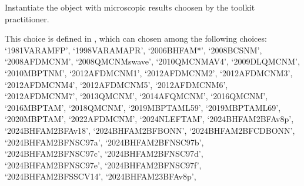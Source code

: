 \documentclass[letterpaper,10pt,english]{sphinxmanual}
\begin{document}
\begin{fulllineitems}
\label{\detokenize{source/api/setup_micro_matter:nucleardatapy.setup_micro_matter.SetupMicroMatter}}
\pysigstartsignatures
{}
\pysigstopsignatures
\sphinxAtStartPar
Instantiate the object with microscopic results choosen     by the toolkit practitioner.

\sphinxAtStartPar
This choice is defined in , which can chosen among     the following choices:     ‘1981\sphinxhyphen{}VAR\sphinxhyphen{}AM\sphinxhyphen{}FP’, ‘1998\sphinxhyphen{}VAR\sphinxhyphen{}AM\sphinxhyphen{}APR’, ‘2006\sphinxhyphen{}BHF\sphinxhyphen{}AM*’, ‘2008\sphinxhyphen{}BCS\sphinxhyphen{}NM’, ‘2008\sphinxhyphen{}AFDMC\sphinxhyphen{}NM’,     ‘2008\sphinxhyphen{}QMC\sphinxhyphen{}NM\sphinxhyphen{}swave’, ‘2010\sphinxhyphen{}QMC\sphinxhyphen{}NM\sphinxhyphen{}AV4’, ‘2009\sphinxhyphen{}DLQMC\sphinxhyphen{}NM’, ‘2010\sphinxhyphen{}MBPT\sphinxhyphen{}NM’,     ‘2012\sphinxhyphen{}AFDMC\sphinxhyphen{}NM\sphinxhyphen{}1’, ‘2012\sphinxhyphen{}AFDMC\sphinxhyphen{}NM\sphinxhyphen{}2’, ‘2012\sphinxhyphen{}AFDMC\sphinxhyphen{}NM\sphinxhyphen{}3’, ‘2012\sphinxhyphen{}AFDMC\sphinxhyphen{}NM\sphinxhyphen{}4’,     ‘2012\sphinxhyphen{}AFDMC\sphinxhyphen{}NM\sphinxhyphen{}5’, ‘2012\sphinxhyphen{}AFDMC\sphinxhyphen{}NM\sphinxhyphen{}6’, ‘2012\sphinxhyphen{}AFDMC\sphinxhyphen{}NM\sphinxhyphen{}7’,     ‘2013\sphinxhyphen{}QMC\sphinxhyphen{}NM’, ‘2014\sphinxhyphen{}AFQMC\sphinxhyphen{}NM’, ‘2016\sphinxhyphen{}QMC\sphinxhyphen{}NM’, ‘2016\sphinxhyphen{}MBPT\sphinxhyphen{}AM’,     ‘2018\sphinxhyphen{}QMC\sphinxhyphen{}NM’, ‘2019\sphinxhyphen{}MBPT\sphinxhyphen{}AM\sphinxhyphen{}L59’, ‘2019\sphinxhyphen{}MBPT\sphinxhyphen{}AM\sphinxhyphen{}L69’,     ‘2020\sphinxhyphen{}MBPT\sphinxhyphen{}AM’, ‘2022\sphinxhyphen{}AFDMC\sphinxhyphen{}NM’, ‘2024\sphinxhyphen{}NLEFT\sphinxhyphen{}AM’,     ‘2024\sphinxhyphen{}BHF\sphinxhyphen{}AM\sphinxhyphen{}2BF\sphinxhyphen{}Av8p’, ‘2024\sphinxhyphen{}BHF\sphinxhyphen{}AM\sphinxhyphen{}2BF\sphinxhyphen{}Av18’, ‘2024\sphinxhyphen{}BHF\sphinxhyphen{}AM\sphinxhyphen{}2BF\sphinxhyphen{}BONN’, ‘2024\sphinxhyphen{}BHF\sphinxhyphen{}AM\sphinxhyphen{}2BF\sphinxhyphen{}CDBONN’,     ‘2024\sphinxhyphen{}BHF\sphinxhyphen{}AM\sphinxhyphen{}2BF\sphinxhyphen{}NSC97a’, ‘2024\sphinxhyphen{}BHF\sphinxhyphen{}AM\sphinxhyphen{}2BF\sphinxhyphen{}NSC97b’, ‘2024\sphinxhyphen{}BHF\sphinxhyphen{}AM\sphinxhyphen{}2BF\sphinxhyphen{}NSC97c’, ‘2024\sphinxhyphen{}BHF\sphinxhyphen{}AM\sphinxhyphen{}2BF\sphinxhyphen{}NSC97d’,     ‘2024\sphinxhyphen{}BHF\sphinxhyphen{}AM\sphinxhyphen{}2BF\sphinxhyphen{}NSC97e’, ‘2024\sphinxhyphen{}BHF\sphinxhyphen{}AM\sphinxhyphen{}2BF\sphinxhyphen{}NSC97f’, ‘2024\sphinxhyphen{}BHF\sphinxhyphen{}AM\sphinxhyphen{}2BF\sphinxhyphen{}SSCV14’,     ‘2024\sphinxhyphen{}BHF\sphinxhyphen{}AM\sphinxhyphen{}23BF\sphinxhyphen{}Av8p’, 
\end{fulllineitems}
\end{document}
